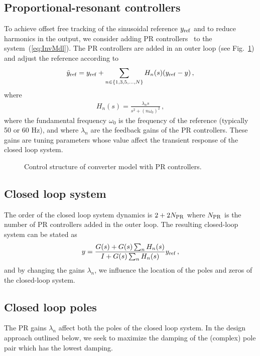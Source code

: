 \documentclass[conference,10pt]{IEEEtran}
\begin{document}
\subsection{Proportional-resonant controllers}

To achieve offset free tracking of the sinusoidal reference $y_{\rm ref}$ and to reduce harmonics in the output, we consider adding PR controllers~\cite{fukuda2001novel} to the system~(\ref{eq:InvMdl}).
The PR controllers are added in an outer loop (see Fig.~\ref{fig:ControlStructure}) and adjust the reference according to
\begin{align*}
\tilde{y}_{\rm ref} = y_{\rm ref} + \sum_{n\in\{1,3,5,\dots, N\}}H_n(s)(y_{\rm ref}-y)\,,
\end{align*}
where
\begin{align*}
H_n(s) = \frac{\lambda_ns}{s^2 + (n\omega_0)^2}\,,
\end{align*}
where the fundamental frequency $\omega_0$ is the frequency of the reference (typically 50 or 60 Hz), and where $\lambda_n$ are the feedback gains of the PR controllers. These gains are tuning parameters whose value affect the transient response of the closed loop system.
\begin{figure}[!h]
\centering

\caption{Control structure of converter model with PR controllers.}
\label{fig:ControlStructure}
\end{figure}


\subsection{Closed loop system}

The order of the closed loop system dynamics is $2+2N_{\rm PR}$ where $N_{\rm PR}$ is the number of PR controllers added in the outer loop. The resulting closed-loop system can be stated as
\begin{align}\label{eq:ClosedLoopTF}
  y = \frac{G(s) + G(s) \sum_n H_n(s)}{I + G(s) \sum_n H_n(s)} y_{\rm ref}\,,
\end{align}
and by changing the gains $\lambda_n$, we influence the location of the poles and zeros of the closed-loop system.


\subsection{Closed loop poles}
The PR gains $\lambda_n$ affect both the poles of the closed loop system. In the design approach outlined below, we seek to maximize the damping of the (complex) pole pair which has the lowest damping.
\end{document}
